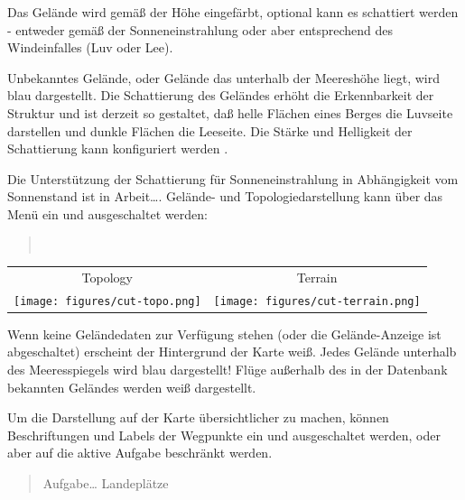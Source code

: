 Das Gelände wird gemäß der Höhe eingefärbt, optional kann es schattiert werden -  entweder gemäß der Sonneneinstrahlung oder aber entsprechend des Windeinfalles (Luv oder Lee).

Unbekanntes Gelände, oder Gelände das unterhalb der Meereshöhe liegt, wird blau dargestellt.
Die Schattierung des Geländes erhöht die Erkennbarkeit der Struktur und ist derzeit so gestaltet, daß helle Flächen eines Berges die Luvseite darstellen und dunkle Flächen die Leeseite.
Die Stärke und Helligkeit der Schattierung kann konfiguriert werden .

Die Unterstützung der Schattierung für Sonneneinstrahlung in Abhängigkeit vom Sonnenstand ist in Arbeit\dots.
Gelände- und Topologiedarstellung kann über das Menü ein und ausgeschaltet werden:
\begin{quote}
\blink{}\blink{} \\[1em]
\blink{}\blink{}
\end{quote}

\begin{center}
\begin{tabular}{c c}
Topology & Terrain \\
\texttt{[image: figures/cut-topo.png]} &
\texttt{[image: figures/cut-terrain.png]} \\
\end{tabular}
\end{center}

Wenn keine Geländedaten zur Verfügung stehen (oder die Gelände-Anzeige ist abgeschaltet) erscheint der Hintergrund der Karte weiß. Jedes Gelände unterhalb des Meeresspiegels wird blau dargestellt!
Flüge außerhalb des in der Datenbank bekannten Geländes werden weiß dargestellt.

Um die Darstellung auf der Karte übersichtlicher zu machen, können Beschriftungen und Labels der Wegpunkte ein und ausgeschaltet werden, oder aber auf die aktive Aufgabe beschränkt werden.

\begin{quote}
\blink{}\blink{}\blink{} {Aufgabe}\blink \dots
{Landeplätze}
\end{quote}


